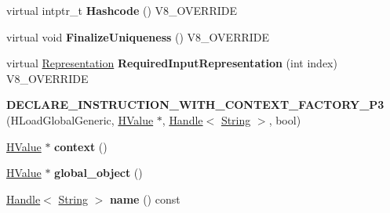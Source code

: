 \begin{DoxyCompactItemize}
\item 
\hypertarget{classv8_1_1internal_1_1_v8___f_i_n_a_l_a9de6559c66079038b00666c92cd21e9c}{}virtual intptr\+\_\+t {\bfseries Hashcode} () V8\+\_\+\+O\+V\+E\+R\+R\+I\+D\+E\label{classv8_1_1internal_1_1_v8___f_i_n_a_l_a9de6559c66079038b00666c92cd21e9c}

\item 
\hypertarget{classv8_1_1internal_1_1_v8___f_i_n_a_l_a935c3ddc60915dd102968e2b529aa1fc}{}virtual void {\bfseries Finalize\+Uniqueness} () V8\+\_\+\+O\+V\+E\+R\+R\+I\+D\+E\label{classv8_1_1internal_1_1_v8___f_i_n_a_l_a935c3ddc60915dd102968e2b529aa1fc}

\item 
\hypertarget{classv8_1_1internal_1_1_v8___f_i_n_a_l_a6c6d1f37f40b113d8f4062f1ffff7215}{}virtual \hyperlink{classv8_1_1internal_1_1_representation}{Representation} {\bfseries Required\+Input\+Representation} (int index) V8\+\_\+\+O\+V\+E\+R\+R\+I\+D\+E\label{classv8_1_1internal_1_1_v8___f_i_n_a_l_a6c6d1f37f40b113d8f4062f1ffff7215}

\item 
\hypertarget{classv8_1_1internal_1_1_v8___f_i_n_a_l_a397bb710e72750e929c33adea4820145}{}{\bfseries D\+E\+C\+L\+A\+R\+E\+\_\+\+I\+N\+S\+T\+R\+U\+C\+T\+I\+O\+N\+\_\+\+W\+I\+T\+H\+\_\+\+C\+O\+N\+T\+E\+X\+T\+\_\+\+F\+A\+C\+T\+O\+R\+Y\+\_\+\+P3} (H\+Load\+Global\+Generic, \hyperlink{classv8_1_1internal_1_1_h_value}{H\+Value} $\ast$, \hyperlink{classv8_1_1internal_1_1_handle}{Handle}$<$ \hyperlink{classv8_1_1internal_1_1_string}{String} $>$, bool)\label{classv8_1_1internal_1_1_v8___f_i_n_a_l_a397bb710e72750e929c33adea4820145}

\item 
\hypertarget{classv8_1_1internal_1_1_v8___f_i_n_a_l_a911a04b75b22f133c5eb5eafcc2d5f87}{}\hyperlink{classv8_1_1internal_1_1_h_value}{H\+Value} $\ast$ {\bfseries context} ()\label{classv8_1_1internal_1_1_v8___f_i_n_a_l_a911a04b75b22f133c5eb5eafcc2d5f87}

\item 
\hypertarget{classv8_1_1internal_1_1_v8___f_i_n_a_l_a825c00f773241cffc076dae8e478d9db}{}\hyperlink{classv8_1_1internal_1_1_h_value}{H\+Value} $\ast$ {\bfseries global\+\_\+object} ()\label{classv8_1_1internal_1_1_v8___f_i_n_a_l_a825c00f773241cffc076dae8e478d9db}

\item 
\hypertarget{classv8_1_1internal_1_1_v8___f_i_n_a_l_ae093884f144601c733c3c49b3af199b4}{}\hyperlink{classv8_1_1internal_1_1_handle}{Handle}$<$ \hyperlink{classv8_1_1internal_1_1_string}{String} $>$ {\bfseries name} () const \label{classv8_1_1internal_1_1_v8___f_i_n_a_l_ae093884f144601c733c3c49b3af199b4}


\end{DoxyCompactItemize}
